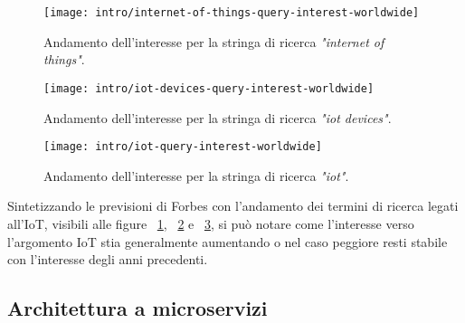 \begin{figure}[H]
    \centering
    \texttt{[image: intro/internet-of-things-query-interest-worldwide]}
    \caption{Andamento dell'interesse per la stringa di ricerca \textit{"internet of things"}. \\ \cite{site:iot-long-trend}}
    \label{fig:internet-of-things-query-interest}
\end{figure}

\begin{figure}[H]
    \centering
    \texttt{[image: intro/iot-devices-query-interest-worldwide]}
    \caption{Andamento dell'interesse per la stringa di ricerca \textit{"iot devices"}. \\ \cite{site:iot-devices-trend}}
    \label{fig:iot-devices-query-interest}
\end{figure}

\begin{figure}[H]
    \centering
    \texttt{[image: intro/iot-query-interest-worldwide]}
    \caption{Andamento dell'interesse per la stringa di ricerca \textit{"iot"}. \\ \cite{site:iot-short-trend}}
    \label{fig:iot-query-interest}
\end{figure}

Sintetizzando le previsioni di Forbes con l'andamento dei termini di ricerca legati all'IoT, visibili alle figure ~\ref{fig:internet-of-things-query-interest}, ~\ref{fig:iot-devices-query-interest} e ~\ref{fig:iot-query-interest}, si può notare come l'interesse verso l'argomento IoT stia generalmente aumentando o nel caso peggiore resti stabile con l'interesse degli anni precedenti.

\subsection{Architettura a microservizi}

